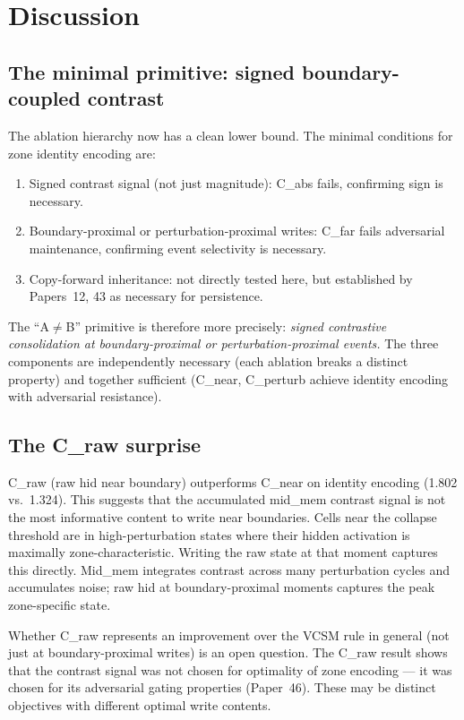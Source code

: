 \documentclass[11pt,a4paper]{article}
\begin{document}
\section{Discussion}

\subsection{The minimal primitive: signed boundary-coupled contrast}

The ablation hierarchy now has a clean lower bound.
The minimal conditions for zone identity encoding are:
\begin{enumerate}
  \item Signed contrast signal (not just magnitude): C\_abs fails, confirming sign is necessary.
  \item Boundary-proximal or perturbation-proximal writes: C\_far fails adversarial
    maintenance, confirming event selectivity is necessary.
  \item Copy-forward inheritance: not directly tested here, but established
    by Papers~12, 43 as necessary for persistence.
\end{enumerate}

The ``A$\neq$B'' primitive is therefore more precisely:
\emph{signed contrastive consolidation at boundary-proximal or perturbation-proximal events.}
The three components are independently necessary (each ablation breaks a distinct property)
and together sufficient (C\_near, C\_perturb achieve identity encoding with adversarial resistance).

\subsection{The C\_raw surprise}

C\_raw (raw hid near boundary) outperforms C\_near on identity encoding (1.802 vs.\ 1.324).
This suggests that the accumulated mid\_mem contrast signal is not the most informative
content to write near boundaries.
Cells near the collapse threshold are in high-perturbation states where their hidden
activation is maximally zone-characteristic.
Writing the raw state at that moment captures this directly.
Mid\_mem integrates contrast across many perturbation cycles and accumulates noise;
raw hid at boundary-proximal moments captures the peak zone-specific state.

Whether C\_raw represents an improvement over the VCSM rule in general
(not just at boundary-proximal writes) is an open question.
The C\_raw result shows that the contrast signal was not chosen for optimality
of zone encoding --- it was chosen for its adversarial gating properties (Paper~46).
These may be distinct objectives with different optimal write contents.
\end{document}
